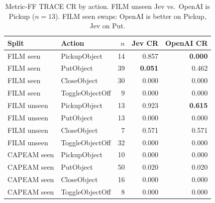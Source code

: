 \begin{table}[t]
\centering
\caption{Metric-FF TRACE CR by action.
FILM unseen Jev vs.\ OpenAI is Pickup ($n{=}13$).
FILM seen swaps: OpenAI is better on Pickup, Jev on Put.}
\label{tab:action}
\scriptsize
\setlength{\tabcolsep}{3.5pt}
\begin{tabular}{llrrr}
\toprule
Split & Action & $n$ & Jev CR & OpenAI CR \\
\midrule
FILM seen & PickupObject & 14 & 0.857 & \textbf{0.000} \\
FILM seen & PutObject & 39 & \textbf{0.051} & 0.462 \\
FILM seen & CloseObject & 30 & 0.000 & 0.000 \\
FILM seen & ToggleObjectOff & 9 & 0.000 & 0.000 \\
FILM unseen & PickupObject & 13 & 0.923 & \textbf{0.615} \\
FILM unseen & PutObject & 13 & 0.000 & 0.000 \\
FILM unseen & CloseObject & 7 & 0.571 & 0.571 \\
FILM unseen & ToggleObjectOff & 32 & 0.000 & 0.000 \\
CAPEAM seen & PickupObject & 10 & 0.000 & 0.000 \\
CAPEAM seen & PutObject & 50 & 0.020 & 0.020 \\
CAPEAM seen & CloseObject & 16 & 0.000 & 0.000 \\
CAPEAM seen & ToggleObjectOff & 8 & 0.000 & 0.000 \\
\bottomrule
\end{tabular}
\end{table}
